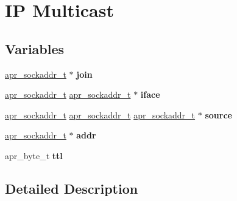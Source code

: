 \hypertarget{group__apr__mcast}{}\section{IP Multicast}
\label{group__apr__mcast}
\subsection*{Variables}
\begin{DoxyCompactItemize}
\item 
\mbox{\label{group__apr__mcast_ga2d95afe63c78661afb200a75da9ae794}} 
\mbox{\hyperlink{structapr__sockaddr__t}{apr\+\_\+sockaddr\+\_\+t}} $\ast$ {\bfseries join}
\item 
\mbox{\label{group__apr__mcast_ga723508cfed79f6d0c8b49717f7e56178}} 
\mbox{\hyperlink{structapr__sockaddr__t}{apr\+\_\+sockaddr\+\_\+t}} \mbox{\hyperlink{structapr__sockaddr__t}{apr\+\_\+sockaddr\+\_\+t}} $\ast$ {\bfseries iface}
\item 
\mbox{\label{group__apr__mcast_ga0e8eb33ac3362aea4e83d2c415b2dc17}} 
\mbox{\hyperlink{structapr__sockaddr__t}{apr\+\_\+sockaddr\+\_\+t}} \mbox{\hyperlink{structapr__sockaddr__t}{apr\+\_\+sockaddr\+\_\+t}} \mbox{\hyperlink{structapr__sockaddr__t}{apr\+\_\+sockaddr\+\_\+t}} $\ast$ {\bfseries source}
\item 
\mbox{\label{group__apr__mcast_gaf32a3eae6659774e82d8fc61ebc0169d}} 
\mbox{\hyperlink{structapr__sockaddr__t}{apr\+\_\+sockaddr\+\_\+t}} $\ast$ {\bfseries addr}
\item 
\mbox{\label{group__apr__mcast_gaecc55bc3d317d868b03f6b7136d66f36}} 
apr\+\_\+byte\+\_\+t {\bfseries ttl}
\end{DoxyCompactItemize}


\subsection{Detailed Description}
